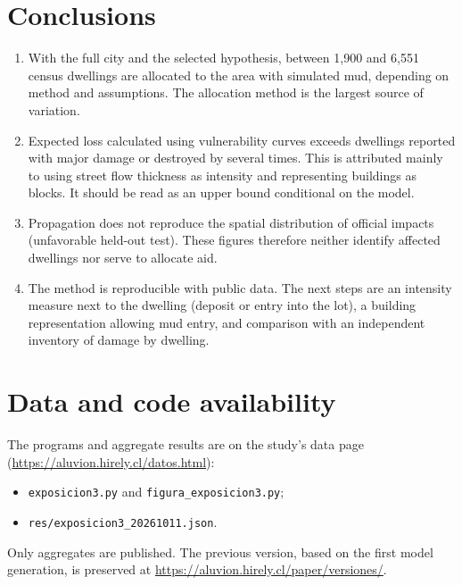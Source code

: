 \documentclass[10pt,a4paper]{article}
\begin{document}
\section{Conclusions}
\begin{enumerate}
\item With the full city and the selected hypothesis, between 1,900 and 6,551 census dwellings are allocated to the area with simulated mud, depending on method and assumptions. The allocation method is the largest source of variation.
\item Expected loss calculated using vulnerability curves exceeds dwellings reported with major damage or destroyed by several times. This is attributed mainly to using street flow thickness as intensity and representing buildings as blocks. It should be read as an upper bound conditional on the model.
\item Propagation does not reproduce the spatial distribution of official impacts (unfavorable held-out test). These figures therefore neither identify affected dwellings nor serve to allocate aid.
\item The method is reproducible with public data. The next steps are an intensity measure next to the dwelling (deposit or entry into the lot), a building representation allowing mud entry, and comparison with an independent inventory of damage by dwelling.
\end{enumerate}

\section*{Data and code availability}
The programs and aggregate results are on the study's data page (\url{https://aluvion.hirely.cl/datos.html}):
\begin{itemize}
\item \texttt{exposicion3.py} and \texttt{figura\_exposicion3.py};
\item \texttt{res/exposicion3\_20261011.json}.
\end{itemize}
Only aggregates are published. The previous version, based on the first model generation, is preserved at \url{https://aluvion.hirely.cl/paper/versiones/}.



\end{document}
